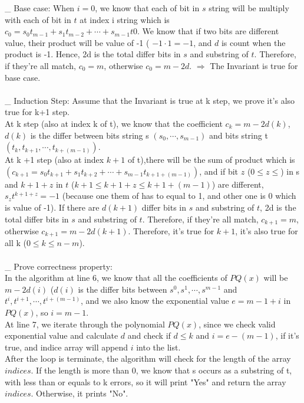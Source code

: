\documentclass[11pt]{article}
\newenvironment{qparts}{\begin{enumerate}[{(}a{)}]}{\end{enumerate}}
\newcommand{\tab}{\hspace*{2em}}
\begin{document}
\begin{qparts}
\_ Base case:
When $i = 0$, we know that each of bit in $s$ string will be multiply with each of bit in $t$ at index i string which is $c_0 = s_0 t_{m-1} + s_1 t_{m-2} + \cdots + s_{m-1} t{0}$. We know that if two bits are different value, their product will be value of -1 ( $-1\cdot 1 = -1$, and $d$ is count when the product is -1. Hence, 2d is the total differ bits in $s$ and substring of $t$. Therefore, if they're all match, $c_0 = m$, otherwise $c_0 = m-2d$. $\Rightarrow$ The Invariant is true for base case.\\
\\
\_ Induction Step: Assume that the Invariant is true at k step, we prove it's also true for k+1 step.\\
At k step (also at index k of t), we know that the coefficient $c_k = m-2d(k)$, $d(k)$ is the differ between bits string s $(s_0, \cdots , s_{m-1})$ and bits string t $(t_{k}, t_{k + 1}, \cdots, t_{k + (m-1)} )$.\\
At k +1 step (also at index $k+1$ of t),there will be the sum of product which is $(c_{k+1} = s_0 t_{k+1} + s_1 t_{k+2} + \cdots + s_{m-1} t_{k+1 +(m-1)})$, and if bit $z$ ($0\leqslant z \leqslant$) in s and $k + 1 +z$ in $t$ ($k+1\leqslant k+1+ z  \leqslant k+1+(m-1)$) are different, $s_z t^{k+1+z} = -1$ (because one them of has to equal to 1, and other one is 0 which is value of -1). If there are $d(k+1)$ differ bits in $s$ and substring of $t$, 2d is the total differ bits in $s$ and substring of $t$. Therefore, if they're all match, $c_{k+1} = m$, otherwise $c_{k+1} = m-2d(k+1)$.
Therefore, it's true for $k+1$, it's also true for all k ($0\leqslant k \leqslant n-m$).\\
\\
\_ Prove correctness property:\\
\tab In the algorithm at line 6, we know that all the coefficients of $PQ(x)$ will be $m-2d(i)$ ($d(i)$ is the differ bits between $s^0, s^1,\cdots, s^{m-1}$ and $t^{i}, t^{i+1},\cdots, t^{i+ (m-1)}$, and we also know the exponential value $e = m-1 + i$ in $PQ(x)$, so $i = m-1$.\\
At line 7, we iterate through the polynomial $PQ(x)$, since we check valid exponential value and calculate $d$ and check if $d\leqslant k$ and $i = e -(m-1)$, if it's true, and indice array will append $i$ into the list.\\
After the loop is terminate, the algorithm will check for the length of the array $indices$. If the length is more than 0, we know that s occurs as a substring of t, with less than or equals to k errors, so it will print "Yes" and return the array $indices$. Otherwise, it prints "No".


\end{qparts}
\end{document}
